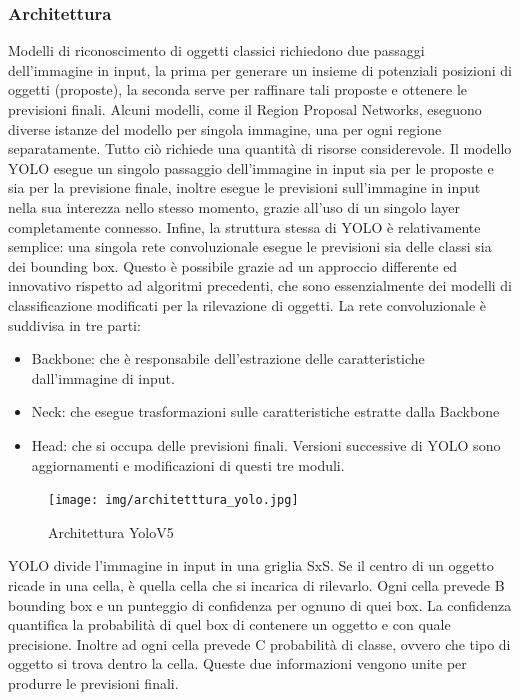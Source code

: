 \documentclass{article}
\begin{document}
    \subsubsection{Architettura}
    \cite{yolotutorial}  \cite{yoloarch}
    Modelli di riconoscimento di oggetti classici richiedono due passaggi dell'immagine in input, la prima per generare un insieme di potenziali posizioni di oggetti (proposte), la seconda serve per raffinare tali proposte e ottenere le previsioni finali.
    Alcuni modelli, come il Region Proposal Networks, eseguono diverse istanze del modello per singola immagine, una per ogni regione separatamente. Tutto ciò richiede una quantità di risorse considerevole.
    Il modello YOLO esegue un singolo passaggio dell'immagine in input sia per le proposte e sia per la previsione finale, inoltre esegue le previsioni sull'immagine in input nella sua interezza nello stesso momento, grazie all'uso di un singolo layer completamente connesso. 
    Infine, la struttura stessa di YOLO è relativamente semplice: una singola rete convoluzionale esegue le previsioni sia delle classi sia dei bounding box. Questo è possibile grazie ad un approccio differente ed innovativo rispetto ad algoritmi precedenti, che sono essenzialmente dei modelli di classificazione modificati per la rilevazione di oggetti.
    La rete convoluzionale è suddivisa in tre parti: 
    \begin{itemize}
        \item Backbone: che è responsabile dell'estrazione delle caratteristiche dall'immagine di input.
        \item Neck: che esegue trasformazioni sulle caratteristiche estratte dalla Backbone
        \item Head: che si occupa delle previsioni finali.
    Versioni successive di YOLO sono aggiornamenti e modificazioni di questi tre moduli.
    \end{itemize}
    
\begin{figure}[h!]
    \centering
    \texttt{[image: img/architetttura\_yolo.jpg]}
    \caption{Architettura YoloV5}
\end{figure}

\newpage
YOLO divide l'immagine in input in una griglia SxS. Se il centro di un oggetto ricade in una cella, è quella cella che si incarica di rilevarlo.
Ogni cella prevede B bounding box e un punteggio di confidenza per ognuno di quei box. La confidenza quantifica la probabilità di quel box di contenere un oggetto e con quale precisione. Inoltre ad ogni cella prevede C probabilità di classe, ovvero che tipo di oggetto si trova dentro la cella. 
Queste due informazioni vengono unite per produrre le previsioni finali.
\end{document}
